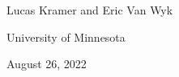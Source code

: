 \documentclass[11pt,aspectratio=169]{beamer}
\begin{document}
\begin{frame}
\begin{center}

{\Large{}}

\vskip 0.25cm
{\large{}}

\vskip 1cm
Lucas Kramer and Eric Van Wyk

\medskip
University of Minnesota

\bigskip
August 26, 2022

\end{center}
\end{frame}


\end{document}
